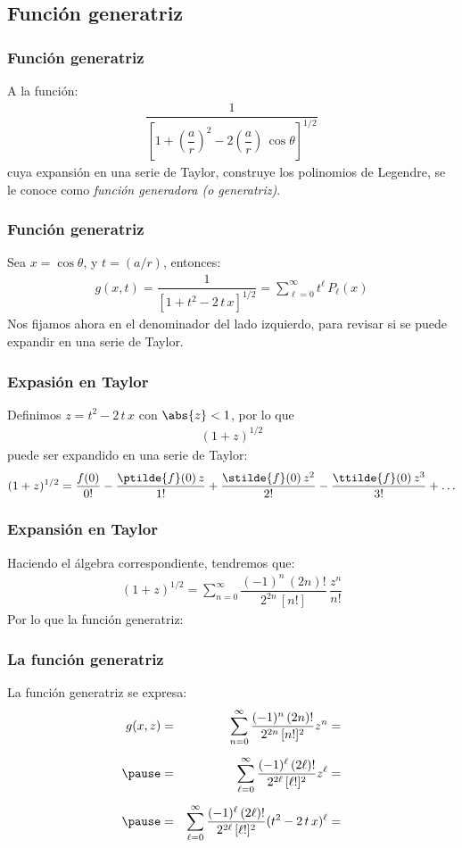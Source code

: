 \subsection{Función generatriz}
\begin{frame}
\frametitle{Función generatriz}
A la función:
\begin{align*}
\dfrac{1}{\left[ 1 + \left( \dfrac{a}{r} \right)^{2} - 2 \left( \dfrac{a}{r} \right) \, \cos \theta \right]^{1/2}}
\end{align*}
cuya expansión en una serie de Taylor, construye los polinomios de Legendre, se le conoce como \emph{función generadora (o generatriz)}.
\end{frame}
\begin{frame}
\frametitle{Función generatriz}
Sea $x = \cos \theta$, y $t = (a/r)$, entonces:
\begin{align*}
g(x, t) = \dfrac{1}{\left[ 1 + t^{2} - 2 \, t \, x \right]^{1/2} } = \sum_{\ell=0}^{\infty} t^{\ell} \, P_{\ell} (x)
\end{align*}
\pause
Nos fijamos ahora en el denominador del lado izquierdo, para revisar si se puede expandir en una serie de Taylor.
\end{frame}
\begin{frame}
\frametitle{Expasión en Taylor}
Definimos $z = t^{2} - 2 \, t \, x$ con $\abs{z} < 1$, por lo que
\begin{align*}
(1 + z)^{1/2}
\end{align*}
puede ser expandido en una serie de Taylor: 
\pause
\fontsize{12}{12}\selectfont
\begin{align*}
(1 + z)^{1/2} = \dfrac{f(0)}{0!} - \dfrac{\ptilde{f}(0) \, z}{1!} + \dfrac{\stilde{f}(0) \, z^{2}}{2!} - \dfrac{\ttilde{f}(0) \, z^{3}}{3!} + \ldots
\end{align*}
\end{frame}
\begin{frame}
\frametitle{Expansión en Taylor}
Haciendo el álgebra correspondiente, tendremos que:
\begin{align*}
(1 + z)^{1/2} = \sum_{n=0}^{\infty} \dfrac{(-1)^{n} \, (2 n)!}{2^{2 n} \, [n!]} \, \dfrac{z^{n}}{n!}
\end{align*}
\pause
Por lo que la función generatriz:
\end{frame}
\begin{frame}
\frametitle{La función generatriz}
La función generatriz se expresa:
\begin{eqnarray*}
g(x, z) &=& \sum_{n=0}^{\infty} \dfrac{(-1)^{n} \, (2 n)!}{2^{2 n} \, [n!]^{2}} z^{n} = \\[0.5em] \pause
&=& \sum_{\ell=0}^{\infty} \dfrac{(-1)^{\ell} \, (2 \ell)!}{2^{2 \ell} \, [\ell!]^{2}} z^{\ell} = \\[0.5em] \pause
&=& \sum_{\ell=0}^{\infty} \dfrac{(-1)^{\ell} \, (2 \ell)!}{2^{2 \ell} \, [\ell!]^{2}} (t^{2} - 2 \, t \, x)^{\ell} = 
\end{eqnarray*}
\end{frame}
